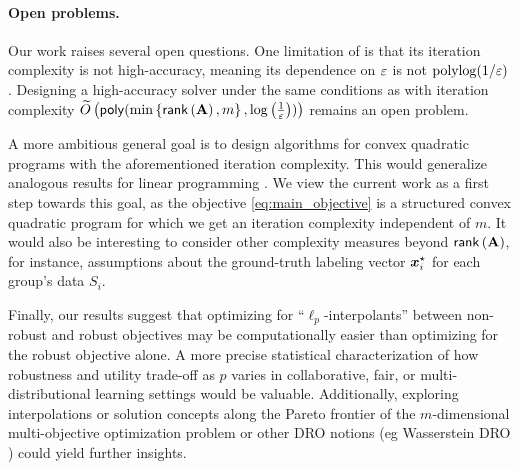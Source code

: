 \paragraph{Open problems.} 
Our work raises several open questions. One limitation of  is that its iteration complexity is not high-accuracy, meaning its dependence on \( \varepsilon \) is not \(\mathrm{polylog}(1/\varepsilon)\). Designing a high-accuracy solver under the same conditions as  with iteration complexity \(\widetilde{O}\left(\mathsf{poly}(\min\left\{\mathsf{rank}\left(\mathbf{A}\right), m\right\}, \log\left(\frac{1}{\varepsilon}\right))\right)\) remains an open problem.

A more ambitious general goal is to design algorithms for convex quadratic programs with the aforementioned iteration complexity. This would generalize analogous results for linear programming \citep{ls19}. We view the current work as a first step towards this goal, as the objective \eqref{eq:main_objective} is a structured convex quadratic program for which we get an iteration complexity independent of $m$. It would also be interesting to consider other complexity measures beyond $\mathsf{rank}\left(\mathbf{A}\right)$, for instance, assumptions about the ground-truth labeling vector $\bm{x}_i^\star$ for each group's data $S_i$.

Finally, our results suggest that optimizing for ``$\ell_p$-interpolants'' between non-robust and robust objectives may be computationally easier than optimizing for the robust objective alone. A more precise statistical characterization of how robustness and utility trade-off as \( p \) varies in collaborative, fair, or multi-distributional learning settings would be valuable. Additionally, exploring interpolations or solution concepts along the Pareto frontier of the \( m \)-dimensional multi-objective optimization problem or other DRO notions (eg Wasserstein DRO \citep{bkm19, cpo20}) could yield further insights.
